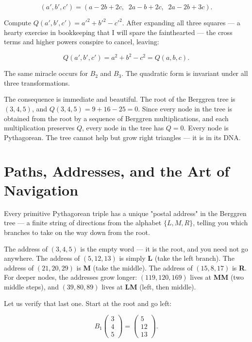 \documentclass[11pt,twoside,openright]{book}
\theoremstyle{definition}
\theoremstyle{remark}
\begin{document}
\[(a' , b', c') = (a - 2b + 2c, \;\; 2a - b + 2c, \;\; 2a - 2b + 3c).\]

Compute $Q(a', b', c') = a'^2 + b'^2 - c'^2$. After expanding all three squares --- a hearty exercise in bookkeeping that I will spare the fainthearted --- the cross terms and higher powers conspire to cancel, leaving:

\[Q(a', b', c') = a^2 + b^2 - c^2 = Q(a, b, c).\]

The same miracle occurs for $B_2$ and $B_3$. The quadratic form is invariant under all three transformations.

The consequence is immediate and beautiful. The root of the Berggren tree is $(3, 4, 5)$, and $Q(3, 4, 5) = 9 + 16 - 25 = 0$. Since every node in the tree is obtained from the root by a sequence of Berggren multiplications, and each multiplication preserves $Q$, every node in the tree has $Q = 0$. Every node is Pythagorean. The tree cannot help but grow right triangles --- it is in its DNA.



\section{Paths, Addresses, and the Art of Navigation}

Every primitive Pythagorean triple has a unique "postal address" in the Berggren tree --- a finite string of directions from the alphabet $\{L, M, R\}$, telling you which branches to take on the way down from the root.

The address of $(3, 4, 5)$ is the empty word --- it is the root, and you need not go anywhere. The address of $(5, 12, 13)$ is simply \textbf{L} (take the left branch). The address of $(21, 20, 29)$ is \textbf{M} (take the middle). The address of $(15, 8, 17)$ is \textbf{R}. For deeper nodes, the addresses grow longer: $(119, 120, 169)$ lives at \textbf{MM} (two middle steps), and $(39, 80, 89)$ lives at \textbf{LM} (left, then middle).

Let us verify that last one. Start at the root and go left:

\[B_1 \begin{pmatrix} 3 \\ 4 \\ 5 \end{pmatrix} = \begin{pmatrix} 5 \\ 12 \\ 13 \end{pmatrix}.\]
\end{document}
